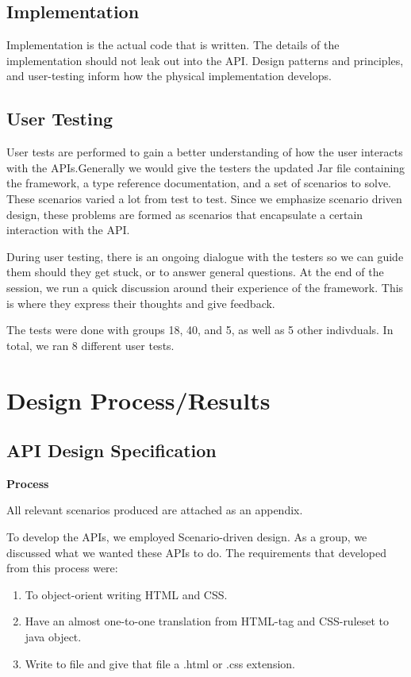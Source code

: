 \documentclass[12pt]{article}
\begin{document}
    \subsection{Implementation}

    Implementation is the actual code that is written. The details of the implementation should not leak out into the API. Design patterns and principles, and user-testing inform how the physical implementation develops.

    \subsection{User Testing}

    User tests are performed to gain a better understanding of how the user interacts with the APIs.Generally we would give the testers the updated Jar file containing the framework, a type reference documentation, and a set of scenarios to solve. These scenarios varied a lot from test to test. Since we emphasize scenario driven design, these problems are formed as scenarios that encapsulate a certain interaction with the API.  

    During user testing, there is an ongoing dialogue with the testers so we can guide them should they get stuck, or to answer general questions. At the end of the session, we run a quick discussion around their experience of the framework. This is where they express their thoughts and give feedback.

    The tests were done with groups 18, 40, and 5, as well as 5 other indivduals. In total, we ran 8 different user tests.


\section{Design Process/Results}

    \subsection{API Design Specification}


    \textbf{Process}

    All relevant scenarios produced are attached as an appendix.

    To develop the APIs, we employed Scenario-driven design. As a group, we discussed what we wanted these APIs to do. The requirements that developed from this process were:

    \begin{enumerate}
        \item To object-orient writing HTML and CSS.
        \item Have an almost one-to-one translation from HTML-tag and CSS-ruleset to java object.
        \item Write to file and give that file a .html or .css extension. 
    \end{enumerate}
    
\end{document}
